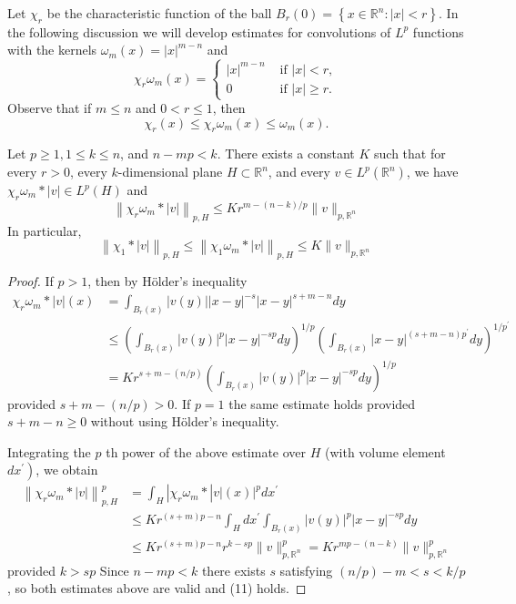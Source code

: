 Let $\chi_r$ be the characteristic function of the ball $B_r(0)=\left\{x \in \mathbb{R}^n:|x|<r\right\}$. In the following discussion we will develop estimates for convolutions of $L^p$ functions with the kernels $\omega_m(x)=|x|^{m-n}$ and
\[
\chi_r \omega_m(x)= \begin{cases}|x|^{m-n} & \text { if }|x|<r, \\ 0 & \text { if }|x| \geq r .\end{cases}
\]
Observe that if $m \leq n$ and $0<r \leq 1$, then
\[
\chi_r(x) \leq \chi_r \omega_m(x) \leq \omega_m(x).
\]


\begin{lemma}
  Let $p \geq 1,1 \leq k \leq n$, and $n-m p<k$. There exists a constant $K$ such that for every $r>0$, every $k$-dimensional plane $H \subset \mathbb{R}^n$, and every $v \in L^p\left(\mathbb{R}^n\right)$, we have $\chi_r \omega_m *|v| \in L^p(H)$ and
  \[
  \left\|\chi_r \omega_m *|v|\right\|_{p, H} \leq K r^{m-(n-k) / p}\|v\|_{p, \mathbb{R}^n}
  \]
  In particular,
  \[
  \left\|\chi_1 *|v|\right\|_{p, H} \leq\left\|\chi_1 \omega_m *|v|\right\|_{p, H} \leq K\|v\|_{p, \mathbb{R}^n}
  \]
\end{lemma}

\begin{proof}
  If $p>1$, then by Hölder's inequality
  \[
  \begin{aligned}
  \chi_r \omega_m *|v|(x) & =\int_{B_r(x)}|v(y)||x-y|^{-s}|x-y|^{s+m-n} d y \\
  & \leq\left(\int_{B_r(x)}|v(y)|^p|x-y|^{-s p} d y\right)^{1 / p}\left(\int_{B_r(x)}|x-y|^{(s+m-n) p^{\prime}} d y\right)^{1 / p^{\prime}} \\
  & =K r^{s+m-(n / p)}\left(\int_{B_r(x)}|v(y)|^p|x-y|^{-s p} d y\right)^{1 / p}
  \end{aligned}
  \]
  provided $s+m-(n / p)>0$. If $p=1$ the same estimate holds provided $s+m-n \geq 0$ without using Hölder's inequality.
  
  Integrating the $p$ th power of the above estimate over $H$ (with volume element $\left.d x^{\prime}\right)$, we obtain
  \[
  \begin{aligned}
  \left\|\chi_r \omega_m *|v|\right\|_{p, H}^p & =\int_H\left|\chi_r \omega_m *\right| v|(x)|^p d x^{\prime} \\
  & \leq K r^{(s+m) p-n} \int_H d x^{\prime} \int_{B_r(x)}|v(y)|^p|x-y|^{-s p} d y \\
  & \leq K r^{(s+m) p-n} r^{k-s p}\|v\|_{p, \mathbb{R}^n}^p=K r^{m p-(n-k)}\|v\|_{p, \mathbb{R}^n}^p
  \end{aligned}
  \]
  provided $k>s p$
  Since $n-m p<k$ there exists $s$ satisfying $(n / p)-m<s<k / p$, so both estimates above are valid and (11) holds.
\end{proof}


